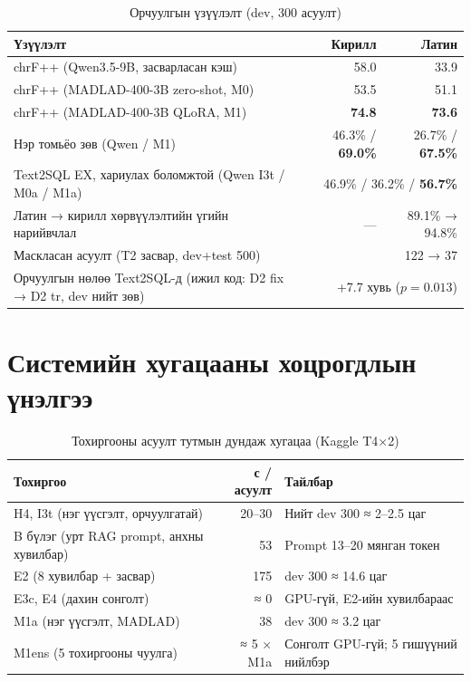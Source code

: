 \begin{table}[H]
\centering\small
\caption{Орчуулгын үзүүлэлт (dev, 300 асуулт)}
\label{tab:mt-results}
\begin{tabularx}{\textwidth}{X r r}
\toprule
Үзүүлэлт & Кирилл & Латин \\
\midrule
chrF++ (Qwen3.5-9B, засварласан кэш) & 58.0 & 33.9 \\
chrF++ (MADLAD-400-3B zero-shot, M0) & 53.5 & 51.1 \\
chrF++ (MADLAD-400-3B QLoRA, M1) & \textbf{74.8} & \textbf{73.6} \\
Нэр томьёо зөв (Qwen / M1) & 46.3\% / \textbf{69.0\%} & 26.7\% / \textbf{67.5\%} \\
Text2SQL EX, хариулах боломжтой (Qwen I3t / M0a / M1a) & \multicolumn{2}{r}{46.9\% / 36.2\% / \textbf{56.7\%}} \\
Латин → кирилл хөрвүүлэлтийн үгийн нарийвчлал & --- & 89.1\% → 94.8\% \\
Маскласан асуулт (T2 засвар, dev+test 500) & \multicolumn{2}{r}{122 → 37} \\
Орчуулгын нөлөө Text2SQL-д (ижил код: D2 fix → D2 tr, dev нийт зөв) & \multicolumn{2}{r}{+7.7 хувь ($p = 0.013$)} \\
\bottomrule
\end{tabularx}
\end{table}

\section{Системийн хугацааны хоцрогдлын үнэлгээ}
\label{sec:latency}

\begin{table}[H]
\centering\small
\caption{Тохиргооны асуулт тутмын дундаж хугацаа (Kaggle T4×2)}
\label{tab:latency}
\begin{tabularx}{\textwidth}{X r p{4.2cm}}
\toprule
Тохиргоо & с / асуулт & Тайлбар \\
\midrule
H4, I3t (нэг үүсгэлт, орчуулгатай) & ~20--30 & Нийт dev 300 ≈ 2--2.5 цаг \\
B бүлэг (урт RAG prompt, анхны хувилбар) & ~53 & Prompt 13--20 мянган токен \\
E2 (8 хувилбар + засвар) & ~175 & dev 300 ≈ 14.6 цаг \\
E3c, E4 (дахин сонголт) & ≈ 0 & GPU-гүй, E2-ийн хувилбараас \\
M1a (нэг үүсгэлт, MADLAD) & ~38 & dev 300 ≈ 3.2 цаг \\
M1ens (5 тохиргооны чуулга) & ≈ 5 × M1a & Сонголт GPU-гүй; 5 гишүүний нийлбэр \\
\bottomrule
\end{tabularx}
\end{table}


